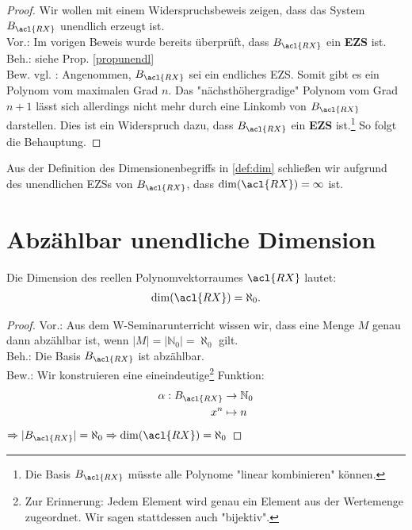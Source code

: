 \begin{proof} 
Wir wollen mit einem Widerspruchsbeweis zeigen, dass das System $B_{\acl{RX}}$ unendlich erzeugt ist.
\\Vor.: Im vorigen Beweis wurde bereits überprüft, dass $B_{\acl{RX}}$ ein \textbf{\acl{EZS}} ist. 
\\Beh.: siehe Prop. \ref{propunendl}
\\Bew. vgl.  \cite[S.498 f.]{Enzy}: Angenommen, $B_{\acl{RX}}$ sei ein endliches \acl{EZS}. Somit gibt es ein Polynom vom maximalen Grad $n$. Das "nächsthöhergradige" Polynom vom Grad $n+1$ lässt sich allerdings nicht mehr durch eine \acl{Linkomb} von $B_{\acl{RX}}$ darstellen. Dies ist ein Widerspruch dazu, dass $B_{\acl{RX}}$ ein \textbf{\acl{EZS}} ist.\footnote{Die Basis $B_{\acl{RX}}$ müsste alle Polynome "linear kombinieren" können.} So folgt die Behauptung.
\end{proof}

\theoremstyle{Corollar}
\begin{Corollar}{ }
Aus der Definition des Dimensionenbegriffs in \ref{def:dim} schließen wir aufgrund des unendlichen \acl{EZS}s von $B_{\acl{RX}}$, dass $\dim(\acl{RX})= \infty$ ist. 
\end{Corollar}

\section{Abzählbar unendliche Dimension}

\theoremstyle{prop}
\begin{prop}{ }
Die Dimension des reellen Polynomvektorraumes $\acl{RX}$ lautet: \begin{align*}\dim(\acl{RX})=\aleph_0\text{.} \end{align*}
\end{prop}

\begin{proof}
Vor.: Aus dem W-Seminarunterricht wissen wir, dass eine Menge $M$ genau dann abzählbar ist, wenn $|M|=|\mathbb{N}_0|=\aleph_0$ gilt.
\\Beh.: Die Basis $B_{\acl{RX}}$ ist abzählbar.
\\Bew.: Wir konstruieren eine eineindeutige\footnote{Zur Erinnerung: Jedem Element wird genau ein Element aus der Wertemenge zugeordnet. Wir sagen stattdessen auch "bijektiv".} Funktion:
\begin{align*}
\alpha: B_{\acl{RX}} &\rightarrow \mathbb{N}_0
\\ x^n &\mapsto n \end{align*}
\(\Rightarrow |B_{\acl{RX}} |=\aleph_0 \Rightarrow \dim(\acl{RX})=\aleph_0\) 
\end{proof}
\newpage
